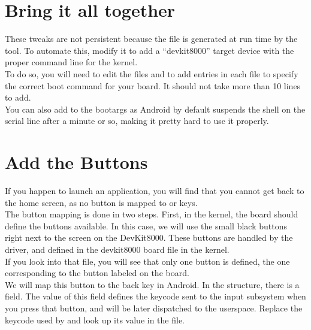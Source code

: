 \section{Bring it all together}

These tweaks are not persistent because the  file is generated at run
time by the  tool. To automate this, modify it to add
a ``devkit8000'' target device with the proper command line for the kernel.\\

To do so, you will need to edit the files
 and
 to add  entries in each
file to specify the correct boot command for your board. It should not take more than 10 lines to
add.\\

You can also add  to the bootargs as Android by
default suspends the shell on the serial line after a minute or so, making it pretty
hard to use it properly.

\section{Add the Buttons}

If you happen to launch an application, you will find that you cannot
get back to the home screen, as no button is mapped to  or 
keys.\\

The button mapping is done in two steps. First, in the kernel, the
board should define the buttons available. In this case, we will use
the small black buttons right next to the screen on the
DevKit8000. These buttons are handled by the  driver,
and defined in the devkit8000 board file in the kernel.\\

If you look into that file, you will see that only one button is
defined, the one corresponding to the button labeled 
on the board.\\

We will map this button to the back key in Android. In the
 structure, there is a  field. The
value of this field defines the keycode sent to the input
subsystem when you press that button, and will be later dispatched to
the userspace. Replace the keycode used by  and look up
its value in the  file.\\

